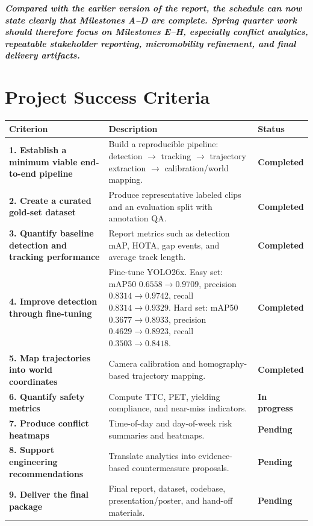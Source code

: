 \documentclass[12pt,letterpaper]{article}
\begin{document}
\textit{\textbf{Compared with the earlier version of the report, the schedule can now state clearly that Milestones A--D are complete. Spring quarter work should therefore focus on Milestones E--H, especially conflict analytics, repeatable stakeholder reporting, micromobility refinement, and final delivery artifacts.}}

\section{Project Success Criteria}

\begin{longtable}{|p{4cm}|p{7cm}|p{2.5cm}|}
\hline
\textbf{Criterion} & \textbf{Description} & \textbf{Status} \\
\hline
\endhead
\textbf{1. Establish a minimum viable end-to-end pipeline} &
Build a reproducible pipeline: detection $\to$ tracking $\to$ trajectory extraction $\to$ calibration/world mapping. & \textbf{Completed} \\
\hline
\textbf{2. Create a curated gold-set dataset} &
Produce representative labeled clips and an evaluation split with annotation QA. & \textbf{Completed} \\
\hline
\textbf{3. Quantify baseline detection and tracking performance} &
Report metrics such as detection mAP, HOTA, gap events, and average track length. & \textbf{Completed} \\
\hline
\textbf{4. Improve detection through fine-tuning} &
Fine-tune YOLO26x. Easy set: mAP50 $0.6558 \to 0.9709$, precision $0.8314 \to 0.9742$, recall $0.8314 \to 0.9329$. Hard set: mAP50 $0.3677 \to 0.8933$, precision $0.4629 \to 0.8923$, recall $0.3503 \to 0.8418$. & \textbf{Completed} \\
\hline
\textbf{5. Map trajectories into world coordinates} &
Camera calibration and homography-based trajectory mapping. & \textbf{Completed} \\
\hline
\textbf{6. Quantify safety metrics} &
Compute TTC, PET, yielding compliance, and near-miss indicators. & \textbf{In progress} \\
\hline
\textbf{7. Produce conflict heatmaps} &
Time-of-day and day-of-week risk summaries and heatmaps. & \textbf{Pending} \\
\hline
\textbf{8. Support engineering recommendations} &
Translate analytics into evidence-based countermeasure proposals. & \textbf{Pending} \\
\hline
\textbf{9. Deliver the final package} &
Final report, dataset, codebase, presentation/poster, and hand-off materials. & \textbf{Pending} \\
\hline
\end{longtable}
\end{document}
